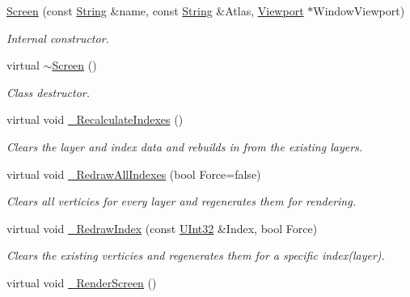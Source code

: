 \begin{DoxyCompactItemize}
\item 
\hyperlink{classMezzanine_1_1UI_1_1Screen_aa39b4b7b96af6251c7304c266ecd85c9}{Screen} (const \hyperlink{namespaceMezzanine_acf9fcc130e6ebf08e3d8491aebcf1c86}{String} \&name, const \hyperlink{namespaceMezzanine_acf9fcc130e6ebf08e3d8491aebcf1c86}{String} \&Atlas, \hyperlink{classMezzanine_1_1Viewport}{Viewport} $\ast$WindowViewport)
\begin{DoxyCompactList}\small\item\em Internal constructor. \item\end{DoxyCompactList}\item 
\hypertarget{classMezzanine_1_1UI_1_1Screen_a99bd65284d2402f653d121b3412f4aca}{
virtual \hyperlink{classMezzanine_1_1UI_1_1Screen_a99bd65284d2402f653d121b3412f4aca}{$\sim$Screen} ()}
\label{classMezzanine_1_1UI_1_1Screen_a99bd65284d2402f653d121b3412f4aca}

\begin{DoxyCompactList}\small\item\em Class destructor. \item\end{DoxyCompactList}\item 
\hypertarget{classMezzanine_1_1UI_1_1Screen_acce659197f0ac025974f88f294d793d4}{
virtual void \hyperlink{classMezzanine_1_1UI_1_1Screen_acce659197f0ac025974f88f294d793d4}{\_\-RecalculateIndexes} ()}
\label{classMezzanine_1_1UI_1_1Screen_acce659197f0ac025974f88f294d793d4}

\begin{DoxyCompactList}\small\item\em Clears the layer and index data and rebuilds in from the existing layers. \item\end{DoxyCompactList}\item 
virtual void \hyperlink{classMezzanine_1_1UI_1_1Screen_a5b14cece4f37e9eee8e0ac20dd0fdcfd}{\_\-RedrawAllIndexes} (bool Force=false)
\begin{DoxyCompactList}\small\item\em Clears all verticies for every layer and regenerates them for rendering. \item\end{DoxyCompactList}\item 
virtual void \hyperlink{classMezzanine_1_1UI_1_1Screen_ad3077ec20a6aeb42b8b77b58a619b08c}{\_\-RedrawIndex} (const \hyperlink{namespaceMezzanine_abea3b8e8e9b03d2547b2800284ba682d}{UInt32} \&Index, bool Force)
\begin{DoxyCompactList}\small\item\em Clears the existing verticies and regenerates them for a specific index(layer). \item\end{DoxyCompactList}\item 
\hypertarget{classMezzanine_1_1UI_1_1Screen_af76f7b0640ad5f7f37cdc5eaf8d5f0cd}{
virtual void \hyperlink{classMezzanine_1_1UI_1_1Screen_af76f7b0640ad5f7f37cdc5eaf8d5f0cd}{\_\-RenderScreen} ()}
\label{classMezzanine_1_1UI_1_1Screen_af76f7b0640ad5f7f37cdc5eaf8d5f0cd}


\end{DoxyCompactItemize}
